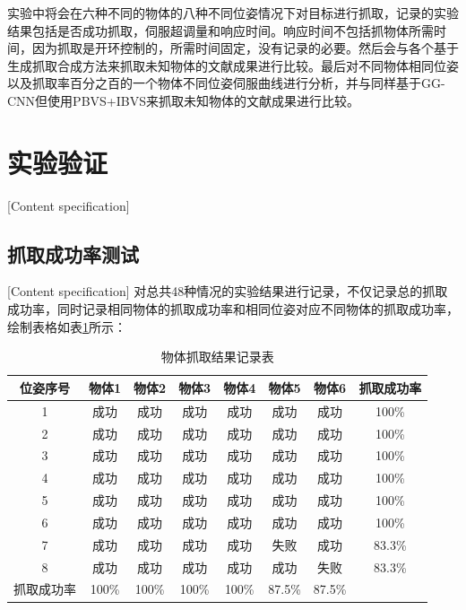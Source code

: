\documentclass[fontset=fandol,type=bachelor,campus=harbin,bsmainpagenumberline=true]{hithesisbook}
\begin{document}
实验中将会在六种不同的物体的八种不同位姿情况下对目标进行抓取，记录的实验结果包括是否成功抓取，伺服超调量和响应时间。响应时间不包括抓物体所需时间，因为抓取是开环控制的，所需时间固定，没有记录的必要。然后会与各个基于生成抓取合成方法来抓取未知物体的文献成果进行比较。最后对不同物体相同位姿以及抓取率百分之百的一个物体不同位姿伺服曲线进行分析，并与同样基于GG-CNN但使用PBVS+IBVS来抓取未知物体的文献成果\cite{haviland2020control}进行比较。


\section{实验验证}[Content specification]
\subsection{抓取成功率测试}[Content specification]
对总共48种情况的实验结果进行记录，不仅记录总的抓取成功率，同时记录相同物体的抓取成功率和相同位姿对应不同物体的抓取成功率，绘制表格如表\ref{物体抓取结果记录表}所示：
\begin{table}[htbp]
\caption{物体抓取结果记录表}
\label{物体抓取结果记录表}
\vspace{0.5em}\centering\wuhao
\begin{tabular}{cccccccc}
\toprule[1.5pt]
位姿序号 & 物体1 & 物体2 & 物体3 & 物体4 & 物体5 & 物体6 & 抓取成功率\\
\midrule[1pt]
 1 & 成功 & 成功 & 成功 & 成功 & 成功 & 成功 & 100\%\\
 2 & 成功 & 成功 & 成功 & 成功 & 成功 & 成功 & 100\%\\
 3 & 成功 & 成功 & 成功 & 成功 & 成功 & 成功 & 100\%\\
 4 & 成功 & 成功 & 成功 & 成功 & 成功 & 成功 & 100\%\\
 5 & 成功 & 成功 & 成功 & 成功 & 成功 & 成功 & 100\%\\
 6 & 成功 & 成功 & 成功 & 成功 & 成功 & 成功 & 100\%\\
 7 & 成功 & 成功 & 成功 & 成功 & 失败 & 成功 & 83.3\%\\
 8 & 成功 & 成功 & 成功 & 成功 & 成功 & 失败 & 83.3\%\\

\bottomrule[1.5pt]
抓取成功率 & 100\% & 100\% & 100\% & 100\% & 87.5\% & 87.5\% & \\
\hline
\end{tabular}
\end{table}
\end{document}
